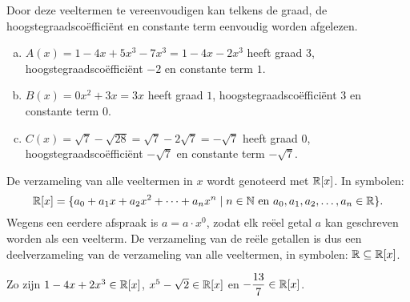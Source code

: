 \documentclass{ximera}
\begin{document}
\begin{example} 
Door deze veeltermen te vereenvoudigen kan telkens de graad, de hoogstegraadscoëfficiënt en constante term eenvoudig worden afgelezen. 
\begin{enumerate}[(a)]
\item
$A(x) = 1-4x+5x^3-7x^3 = 1 - 4x - 2x^3$ heeft graad $3$, hoogstegraadscoëfficiënt $-2$ en constante term $1$.
\item
$B(x) = 0x^2 + 3x = 3x$ heeft graad $1$, hoogstegraadscoëfficiënt $3$ en constante term $0$.
\item
$C(x) = \sqrt{7}-\sqrt{28} = \sqrt{7}-2\sqrt{7} = -\sqrt{7}$ heeft graad $0$, hoogstegraadscoëfficiënt $-\sqrt{7}$ en constante term $-\sqrt{7}$.
\end{enumerate}
\end{example} 


\begin{notation}

    De verzameling van alle veeltermen in $x$ wordt genoteerd met $\mathbb{R}[x]$. In symbolen:
    \[
    \mathbb{R}[x] = \{a_0 + a_1 x + a_2 x^2 + \dots + a_n x^n \mid \text{$n \in \mathbb{N}$ en $a_0,a_1,a_2,\ldots,a_n \in \mathbb{R}$} \}.
    \]
    Wegens een eerdere afspraak is $a = a\cdot x^0$, zodat elk reëel getal $a$ kan geschreven worden als een veelterm. De verzameling van de reële getallen is dus een deelverzameling
    van de verzameling van alle veeltermen, in symbolen: $\mathbb{R} \subseteq \mathbb{R}[x]$.
    
    
    \begin{example} 
       Zo zijn $1-4x+2x^3 \in \mathbb{R}[x]$, $x^5-\sqrt{2} \in \mathbb{R}[x]$ en $\displaystyle -\frac{13}{7} \in \mathbb{R}[x]$.   
    \end{example} 
    
\end{notation}



  
\end{document}
